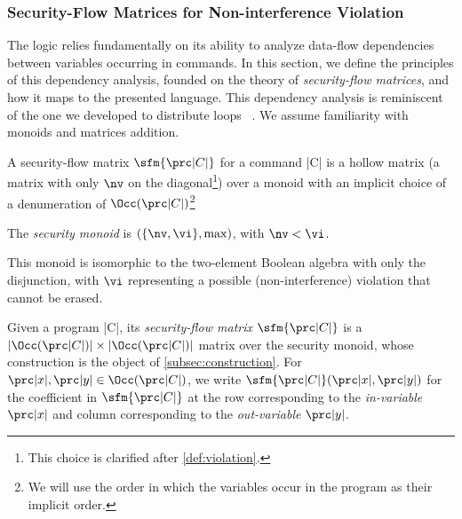 \subsubsection{Security-Flow Matrices for Non-interference Violation}
\label{subsec:sfg}

The \lname logic relies fundamentally on its ability to analyze data-flow dependencies between variables occurring in commands.
In this section, we define the principles of this dependency analysis, founded on the theory of \emph{security-flow matrices}, and how it maps to the presented language.
This dependency analysis is reminiscent of the one we developed to distribute loops~\cite{aubert202213}%
.
We assume %
familiarity with monoids and matrices addition. %

A security-flow matrix $\sfm{\prc|C|}$
for a %
command \prc|C|
is a hollow matrix (\ie a matrix with only $\nv$ on the diagonal\footnote{This choice is clarified after \autoref{def:violation}.}) over a monoid %
with an implicit choice of a denumeration of \(\Occ(\prc|C|)\)\footnote{We will use the order in which the variables occur in the program as their implicit order.}%

\begin{definition}
The \emph{security monoid} is \((\{\nv, \vi\}, \max)\), with \(\nv < \vi\).
\end{definition}

This monoid is isomorphic to the two-element Boolean algebra with only the disjunction, with \(\vi\) representing a possible (non-interference) violation that cannot be erased.

\begin{definition}%
\label{def:sfg}
Given a program \prc|C|, its \emph{security-flow matrix} $\sfm{\prc|C|}$ is a $|\Occ(\prc|C|)|\times |\Occ(\prc|C|)|$ matrix over the security monoid, whose construction is the object of \autoref{subsec:construction}.
%
For \(\prc|x|, \prc|y| \in \Occ(\prc|C|)\), we write $\sfm{\prc|C|}(\prc|x|,\prc|y|)$ for the coefficient in $\sfm{\prc|C|}$ at the row corresponding to the \emph{in-variable} $\prc|x|$ and column corresponding to the \emph{out-variable} $\prc|y|$.
\end{definition}

